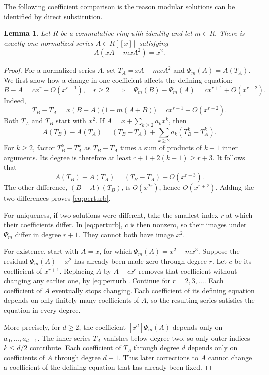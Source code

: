 \documentclass[11pt,a4paper]{article}
\newtheorem{lemma}[theorem]{Lemma}
\theoremstyle{remark}\newtheorem{remark}[theorem]{Remark}
\begin{document}
The following coefficient comparison is the reason modular solutions can
be identified by direct substitution.

\begin{lemma}\label{lem:unique}
Let $R$ be a commutative ring with identity and let $m\in R$. There is exactly
one normalized series $A\in R[[x]]$ satisfying
\[
 A(xA-mxA^2)=x^2.
\]
\end{lemma}

\begin{proof}
For a normalized series $A$, set
$T_A=xA-mxA^2$ and $\Psi_m(A)=A(T_A)$.
We first show how a change in one coefficient affects the defining equation:
\begin{equation}\label{eq:perturb}
 B-A=cx^r+O(x^{r+1}),\quad r\ge2
 \quad\Longrightarrow\quad
 \Psi_m(B)-\Psi_m(A)=cx^{r+1}+O(x^{r+2}).
\end{equation}
Indeed,
\[
 T_B-T_A=x(B-A)\bigl(1-m(A+B)\bigr)
 =cx^{r+1}+O(x^{r+2}).
\]
Both $T_A$ and $T_B$ start with $x^2$. If
$A=x+\sum_{k\ge2}a_kx^k$, then
\[
 A(T_B)-A(T_A)=(T_B-T_A)+\sum_{k\ge2}a_k(T_B^k-T_A^k).
\]
For $k\ge2$, factor $T_B^k-T_A^k$ as $T_B-T_A$ times a sum of
products of $k-1$ inner arguments. Its degree is therefore at least
$r+1+2(k-1)\ge r+3$. It follows that
\[
 A(T_B)-A(T_A)=(T_B-T_A)+O(x^{r+3}).
\]
The other difference, $(B-A)(T_B)$, is $O(x^{2r})$, hence $O(x^{r+2})$.
Adding the two differences proves \eqref{eq:perturb}.

For uniqueness, if two solutions were different, take the smallest index
$r$ at which their coefficients differ. In \eqref{eq:perturb}, $c$ is then
nonzero, so their images under $\Psi_m$ differ in degree $r+1$.
They cannot both have image $x^2$.

For existence, start with $A=x$, for which $\Psi_m(A)=x^2-mx^3$.
Suppose the residual $\Psi_m(A)-x^2$ has already been made zero through
degree $r$. Let $c$ be its coefficient of $x^{r+1}$. Replacing $A$ by
$A-cx^r$ removes that coefficient without changing any earlier one, by
\eqref{eq:perturb}. Continue for $r=2,3,\ldots$. Each coefficient of $A$
eventually stops changing. Each coefficient of its defining equation depends
on only finitely many coefficients of $A$, so the resulting series satisfies
the equation in every degree.

More precisely, for $d\ge2$, the coefficient $[x^d]\Psi_m(A)$ depends
only on $a_0,\ldots,a_{d-1}$. The inner series $T_A$ vanishes below
degree two, so only outer indices $k\le d/2$ contribute. Each coefficient
of $T_A$ through degree $d$ depends only on coefficients of $A$ through
degree $d-1$. Thus later corrections to $A$ cannot change a coefficient
of the defining equation that has already been fixed.
\end{proof}
\end{document}
